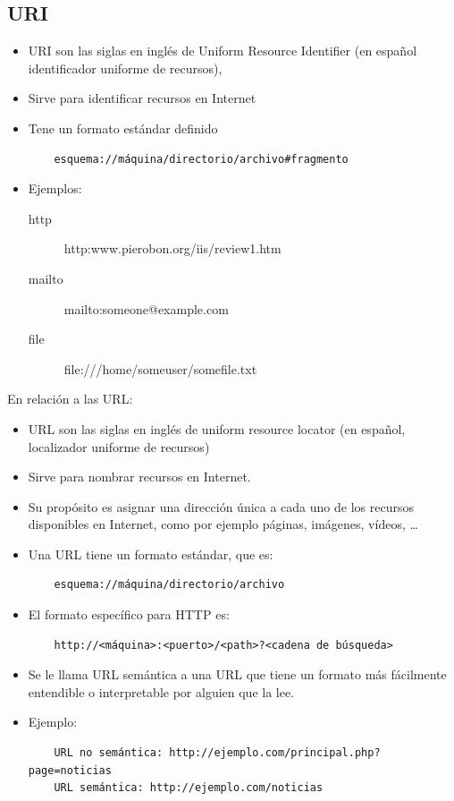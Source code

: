 \documentclass[4paper]{article}
\begin{document}
\subsection{URI}
\begin{itemize}
\item URI son las siglas en inglés de Uniform Resource Identifier (en español identificador uniforme de recursos),
\item Sirve para identificar recursos en Internet
\item Tene un formato estándar definido
\begin{verbatim}
    esquema://máquina/directorio/archivo#fragmento
\end{verbatim}
\item Ejemplos:
\begin{description}
\item[http] http:\/\/www.pierobon.org/iis/review1.htm
\item[mailto] mailto:someone{@}example.com 
\item[file] file:///home/someuser/somefile.txt
\end{description}
\end{itemize}
En relación a las URL:
\begin{itemize}
\item URL son las siglas en inglés de uniform resource locator (en español, localizador uniforme de recursos)
\item Sirve para nombrar recursos en Internet. 
\item Su propósito es asignar una dirección única a cada uno de los recursos disponibles en Internet, como por ejemplo páginas, imágenes, vídeos, \dots
\item Una URL tiene un formato estándar, que es:
\begin{verbatim}
    esquema://máquina/directorio/archivo
\end{verbatim}
\item El formato específico para HTTP es:
\begin{verbatim}
    http://<máquina>:<puerto>/<path>?<cadena de búsqueda>
\end{verbatim}
\item Se le llama URL semántica a una URL que tiene un formato más fácilmente entendible o interpretable por alguien que la lee. 
\item Ejemplo:
\begin{verbatim}
    URL no semántica: http://ejemplo.com/principal.php?page=noticias
    URL semántica: http://ejemplo.com/noticias
\end{verbatim}
\end{itemize}
\end{document}
